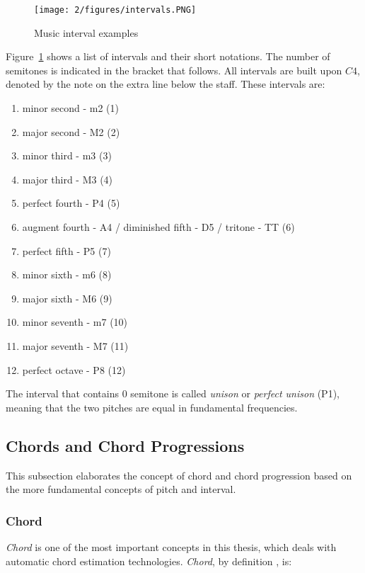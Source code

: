 \begin{figure}[htb]
\centering
\texttt{[image: 2/figures/intervals.PNG]}
\caption{Music interval examples}
\label{fig:2-mi}
\end{figure}

Figure~\ref{fig:2-mi} shows a list of intervals and their short notations. The number of semitones is indicated in the bracket that follows. All intervals are built upon $C4$, denoted by the note on the extra line below the staff. These intervals are:

\begin{enumerate}[label=(\alph*)]
\item minor second - m2 (1)
\item major second - M2 (2)
\item minor third - m3 (3)
\item major third - M3 (4)
\item perfect fourth - P4 (5)
\item augment fourth - A4 / diminished fifth - D5 / tritone - TT (6)
\item perfect fifth - P5 (7)
\item minor sixth - m6 (8)
\item major sixth - M6 (9)
\item minor seventh - m7 (10)
\item major seventh - M7 (11)
\item perfect octave - P8 (12)
\end{enumerate}
The interval that contains $0$ semitone is called {\it unison} or {\it perfect unison} (P1), meaning that the two pitches are equal in fundamental frequencies. %

\subsection{Chords and Chord Progressions}
This subsection elaborates the concept of chord and chord progression based on the more fundamental concepts of pitch and interval.
\subsubsection{Chord}
{\it Chord} is one of the most important concepts in this thesis, which deals with automatic chord estimation technologies. {\it Chord}, by definition \cite{randel1999harvard}, is:

